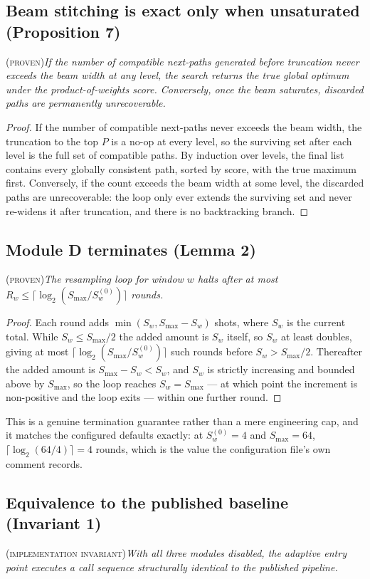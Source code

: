 \documentclass[final,5p,times,longtitle]{elsarticle}
\theoremstyle{plain}
\newcommand{\PROVEN}{\textsc{(proven)}}
\newcommand{\INVAR}{\textsc{(implementation invariant)}}
\newcommand{\Smax}{S_{\max}}
\begin{document}
\subsection{Beam stitching is exact only when unsaturated (Proposition 7)}
\PROVEN{}\quad\textit{If the number of compatible next-paths generated
before truncation never exceeds the beam width at any level, the search
returns the true global optimum under the product-of-weights score.
Conversely, once the beam saturates, discarded paths are permanently
unrecoverable.}

\begin{proof}
If the number of compatible next-paths never exceeds the beam width, the
truncation to the top $P$ is a no-op at every level, so the surviving set
after each level is the full set of compatible paths. By induction over
levels, the final list contains every globally consistent path, sorted by
score, with the true maximum first. Conversely, if the count exceeds the
beam width at some level, the discarded paths are unrecoverable: the loop
only ever extends the surviving set and never re-widens it after
truncation, and there is no backtracking branch.
\end{proof}

\subsection{Module D terminates (Lemma 2)}
\PROVEN{}\quad\textit{The resampling loop for window $w$ halts after at
most $R_w\le\lceil\log_2(\Smax/S_w^{(0)})\rceil$ rounds.}

\begin{proof}
Each round adds $\min(S_w,\Smax-S_w)$ shots, where $S_w$ is the current
total. While $S_w\le\Smax/2$ the added amount is $S_w$ itself, so $S_w$
at least doubles, giving at most $\lceil\log_2(\Smax/S_w^{(0)})\rceil$
such rounds before $S_w>\Smax/2$. Thereafter the added amount is
$\Smax-S_w<S_w$, and $S_w$ is strictly increasing and bounded above by
$\Smax$, so the loop reaches $S_w=\Smax$ --- at which point the increment
is non-positive and the loop exits --- within one further round.
\end{proof}

\noindent
This is a genuine termination guarantee rather than a mere engineering
cap, and it matches the configured defaults exactly: at $S_w^{(0)}=4$ and
$\Smax=64$, $\lceil\log_2(64/4)\rceil=4$ rounds, which is the value the
configuration file's own comment records.

\subsection{Equivalence to the published baseline (Invariant 1)}
\INVAR{}\quad\textit{With all three modules disabled, the adaptive entry
point executes a call sequence structurally identical to the published
pipeline.}
\end{document}
